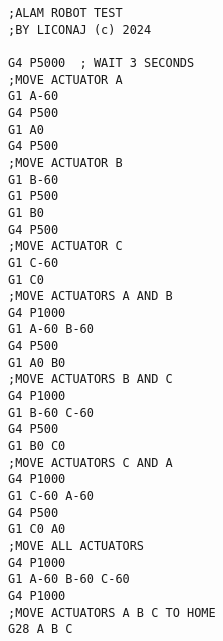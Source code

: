 \begin{verbatim}
;ALAM ROBOT TEST
;BY LICONAJ (c) 2024

G4 P5000  ; WAIT 3 SECONDS
;MOVE ACTUATOR A
G1 A-60
G4 P500
G1 A0
G4 P500
;MOVE ACTUATOR B
G1 B-60
G1 P500
G1 B0
G4 P500
;MOVE ACTUATOR C
G1 C-60
G1 C0
;MOVE ACTUATORS A AND B
G4 P1000
G1 A-60 B-60
G4 P500
G1 A0 B0
;MOVE ACTUATORS B AND C
G4 P1000
G1 B-60 C-60
G4 P500
G1 B0 C0
;MOVE ACTUATORS C AND A
G4 P1000
G1 C-60 A-60
G4 P500
G1 C0 A0
;MOVE ALL ACTUATORS
G4 P1000
G1 A-60 B-60 C-60
G4 P1000
;MOVE ACTUATORS A B C TO HOME
G28 A B C
\end{verbatim}